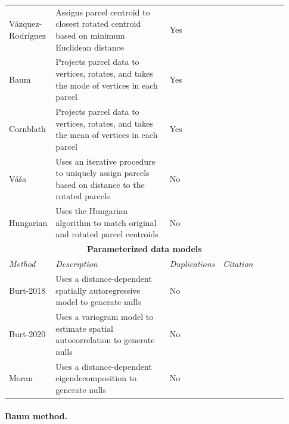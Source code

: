 \documentclass[12pt,aps,pra,reprint,showkeys]{revtex4-1}
\begin{document}
\begin{table}[htp]
\begin{center}
\begin{tabular}{p{0.15\linewidth} p{0.43\linewidth} p{0.10\linewidth} p{0.25\linewidth}}
        V{\'a}zquez-Rodr{\'i}guez & Assigns parcel centroid to closest rotated centroid based on minimum Euclidean distance & Yes & \citet{vazquezrodriguez2019pnas}  \\
        Baum            & Projects parcel data to vertices, rotates, and takes the mode of vertices in each parcel          & Yes & \citet{baum2020pnas}              \\
        Cornblath       & Projects parcel data to vertices, rotates, and takes the mean of vertices in each parcel          & Yes & \citet{cornblath2020commbio}        \\
        V{\'a}{\v{s}}a  & Uses an iterative procedure to uniquely assign parcels based on distance to the rotated parcels   & No  & \citet{vasa2018cercor}            \\
        Hungarian       & Uses the Hungarian algorithm to match original and rotated parcel centroids                       & No  &                                   \\ \toprule
        \multicolumn{4}{c}{\textbf{Parameterized data models}}                                                                                                        \\ \toprule
        \emph{Method}   & \emph{Description}                                                                                & \emph{Duplications} & \emph{Citation}   \\ \midrule
        Burt-2018      & Uses a distance-dependent spatially autoregressive model to generate nulls                         & No  & \citet{burt2018natneuro}          \\
        Burt-2020      & Uses a variogram model to estimate spatial autocorrelation to generate nulls                       & No  & \cite{burt2020neuroimage}         \\
        Moran           & Uses a distance-dependent eigendecomposition to generate nulls                                    & No  & \citet{vosdewael2020brainspace}   \\
      \end{tabular}
    \end{center}
\end{table}

\paragraph*{Baum method.}
\end{document}
